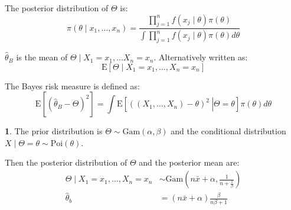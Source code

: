 \documentclass[english,12pt]{article}
\theoremstyle{plain}
\theoremstyle{definition}
\newtheorem*{example}{\protect\examplename}
\theoremstyle{definition} %
\providecommand{\examplename}{Example}
\newcommand{\ex}[1]{\mbox{E} \left[ #1 \right]}
\newcommand{\condex}[2]{\mbox{E} \left[ \left. #1 \ \right\vert \left. #2 \right. \right]}
\begin{document}
The posterior distribution of $\Theta$ is:
\[\pi(\theta\mid x_1,\ldots,x_n)=\frac{\prod_{j=1}^nf(x_j\mid\theta)\pi(\theta)}{\int\prod_{j=1}^nf(x_j\mid\theta)\pi(\theta)d\theta}\]

$\hat\theta_B$ is the mean of $\Theta\mid X_1=x_1,\ldots X_n=x_n$.  Alternatively written as:
\[\ex{\Theta\mid X_1=x_1,\ldots,X_n=x_n}\]

The Bayes risk measure is defined as:
\[\ex{\left(\hat\theta_B-\Theta\right)^2}=\int \condex{\left(\left(X_1,\ldots,X_n\right)-\theta\right)^2}{\Theta=\theta}\pi(\theta)d\theta\]

\begin{example}
The prior distribution is $\Theta\sim \text{Gam}(\alpha,\beta)$ and the conditional distribution $X\mid\Theta=\theta\sim \text{Poi}(\theta)$.

Then the posterior distribution of $\Theta$ and the posterior mean are:
\begin{align*}
\Theta\mid X_1=x_1,\ldots,X_n=x_n&\sim \text{Gam}\left(n\bar{x}+\alpha,\frac{1}{n+\frac{1}{\beta}}\right)\\
\hat\theta_b&=(n\bar{x}+\alpha)\frac{\beta}{n\beta+1}
\end{align*}
\end{example}
\end{document}
